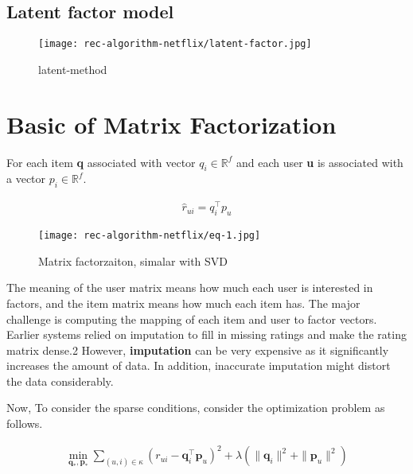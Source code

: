 \documentclass{article}
\begin{document}
\subsection{Latent factor model}

\begin{figure}[H]
    \centering
    \texttt{[image: rec-algorithm-netflix/latent-factor.jpg]}
    \caption{latent-method}
    \label{fig.5}
\end{figure}
\newpage

\section{Basic of Matrix Factorization}
For each item \textbf{q} associated with vector \( q_i \in \mathbb{R}^f \) and each user \textbf{u} is associated with a vector \( p_i \in \mathbb{R}^f \).

\begin{align}
    \hat{r}_{ui} = q_i^\top p_u
\end{align}

\begin{figure}[H]
    \centering
    \texttt{[image: rec-algorithm-netflix/eq-1.jpg]}
    \caption{Matrix factorzaiton, simalar with SVD}
    \label{fig.6}
\end{figure}

\par

The meaning of the user matrix means how much each user is interested in factors, and the item matrix means how much each item has. The major challenge is computing the mapping of each item and user to factor vectors. \\
Earlier systems relied on imputation to fill in missing 
ratings and make the rating matrix dense.2
 However, \textbf{imputation} can be very expensive as it significantly increases 
the amount of data. In addition, inaccurate imputation 
might distort the data considerably.

\newpage

Now, To consider the sparse conditions, consider the optimization problem as follows.

\begin{align}
\min_{\mathbf{q}_*, \mathbf{p}_*} \sum_{(u, i) \in \kappa} \left( r_{ui} - \mathbf{q}_i^\top \mathbf{p}_u \right)^2 + \lambda \left( \|\mathbf{q}_i\|^2 + \|\mathbf{p}_u\|^2 \right)
\end{align}
\end{document}
